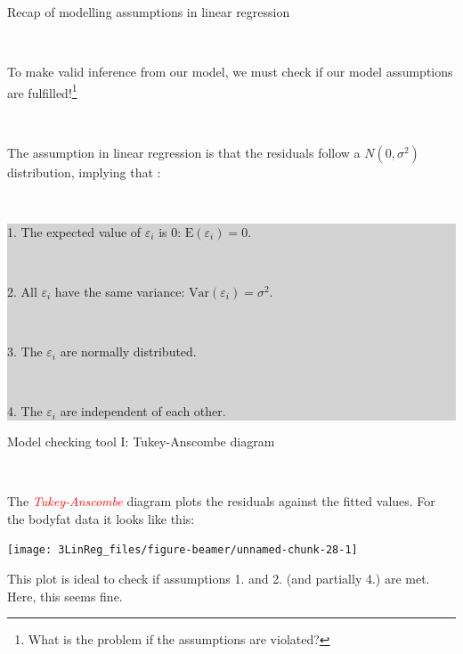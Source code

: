 \documentclass[10pt,ignorenonframetext,]{beamer}
\begin{document}
\begin{frame}

\begin{block}{Recap of modelling assumptions in linear regression}

\(~\)

To make valid inference from our model, we must check if our model
assumptions are
fulfilled!\footnote{What is the problem if the assumptions are violated?}

\(~\)

The assumption in linear regression is that the residuals follow a
\(N(0,\sigma^2)\) distribution, implying that :

\(~\)

\colorbox{lightgray}{\begin{minipage}{10cm}
1. The expected value of $\varepsilon_i$ is 0: $\text{E}(\varepsilon_i)=0$. 

$~$

2. All $\varepsilon_i$ have the same variance: $\text{Var}(\varepsilon_i)=\sigma^2$.  

$~$

3. The $\varepsilon_i$ are normally distributed. 

$~$

4. The $\varepsilon_i$ are independent of each other.
\end{minipage}}

\end{block}

\end{frame}

\begin{frame}

\begin{block}{Model checking tool I: Tukey-Anscombe diagram}

\(~\)

The \emph{\textcolor{red}{Tukey-Anscombe}} diagram plots the residuals
against the fitted values. For the bodyfat data it looks like this:

\begin{center}\texttt{[image: 3LinReg\_files/figure-beamer/unnamed-chunk-28-1]} \end{center}

This plot is ideal to check if assumptions 1. and 2. (and partially 4.)
are met. Here, this seems fine.

\end{block}

\end{frame}
\end{document}
